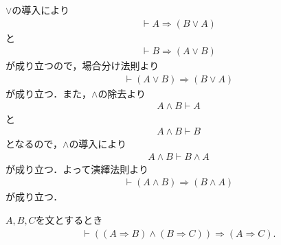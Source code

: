 	\begin{prf}
		$\vee$の導入により
		\begin{align}
			\vdash A \Longrightarrow (B \vee A)
		\end{align}
		と
		\begin{align}
			\vdash B \Longrightarrow (A \vee B)
		\end{align}
		が成り立つので，場合分け法則より
		\begin{align}
			\vdash (A \vee B) \Longrightarrow (B \vee A)
		\end{align}
		が成り立つ．また，$\wedge$の除去より
		\begin{align}
			A \wedge B \vdash A
		\end{align}
		と
		\begin{align}
			A \wedge B \vdash B
		\end{align}
		となるので，$\wedge$の導入により
		\begin{align}
			A \wedge B \vdash B \wedge A
		\end{align}
		が成り立つ．よって演繹法則より
		\begin{align}
			\vdash (A \wedge B) \Longrightarrow (B \wedge A)
		\end{align}
		が成り立つ．
		\QED
	\end{prf}
	
	\begin{screen}
		\begin{logicalthm}[含意の推移律]\label{logicalthm:transitive_law_of_implication}
			$A,B,C$を文とするとき
			\begin{align}
				\vdash ((A \Longrightarrow B) \wedge (B \Longrightarrow C)) 
				\Longrightarrow (A \Longrightarrow C).
			\end{align}
		\end{logicalthm}
	\end{screen}
	
